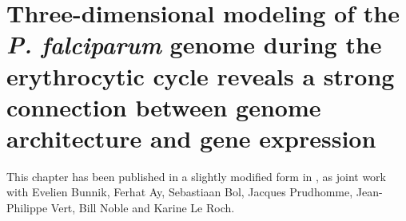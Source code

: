 
\chapter[Genome architecture of the \emph{P. falciparum}
genome]{Three-dimensional modeling of the {\em P. falciparum} genome during
the erythrocytic cycle reveals a strong connection between genome
architecture and gene expression} %

\graphicspath{{3_plasmodium/figures/}}

\begin{work}

This chapter has been published in a slightly modified form in
\citep{ay:three-dimensional}, as joint work with Evelien Bunnik, Ferhat Ay,
Sebastiaan Bol, Jacques Prudhomme, Jean-Philippe Vert, Bill Noble and Karine
Le Roch.

\end{work}

